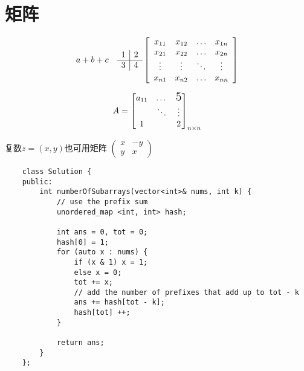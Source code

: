 \documentclass{article}
\begin{document}
\section{矩阵}
    \[
    a + b \\ + c\quad %
    \begin{array}{l | l}
    {1} & {2} \\ 
    \hline
    {3} & {4}
    \end{array} 
    \left[\begin{array}{cccc}
    {x_{11}} & {x_{12}} & {\dots} & {x_{1 n}} \\ 
    {x_{21}} & {x_{22}} & {\dots} & {x_{2 n}} \\ 
    {\vdots} & {\vdots} & {\ddots} & {\vdots} \\ 
    {x_{n 1}} & {x_{n 2}} & {\dots} & {x_{n n}}
    \end{array}\right]
    \]

    \[
    A = \begin{bmatrix}
        a_{11} & \dots & \text{\Large5}\\ %
        & \ddots  & \vdots \\ %
        1 &  & 2    
    \end{bmatrix}_{n \times n} %
    \]

    复数$z = (x, y)$也可用矩阵 
    \begin{math}
    \left(\begin{smallmatrix}
    x & -y \\
    y & x   
    \end{smallmatrix}\right) %
    \end{math}

    \begin{verbatim}
    class Solution {
    public:
        int numberOfSubarrays(vector<int>& nums, int k) {
            // use the prefix sum
            unordered_map <int, int> hash;
             
            int ans = 0, tot = 0;
            hash[0] = 1;
            for (auto x : nums) {
                if (x & 1) x = 1;
                else x = 0;
                tot += x;
                // add the number of prefixes that add up to tot - k
                ans += hash[tot - k]; 
                hash[tot] ++;
            }
            
            return ans;
        }
    };
            
    \end{verbatim}
\end{document}
